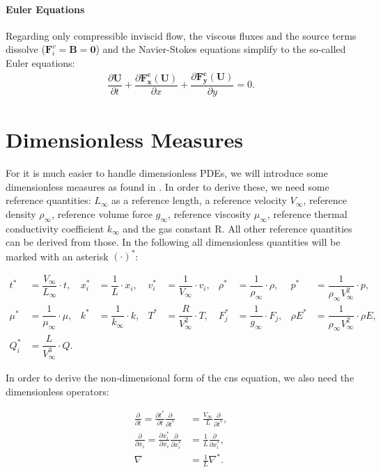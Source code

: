 			\paragraph{Euler Equations}
			Regarding only compressible inviscid flow, the viscous fluxes and the source terms dissolve ($\mathbf{F}_i^v = \mathbf{B} = \mathbf{0}$) and the Navier-Stokes equations simplify to the so-called Euler equations: 
			\begin{align}
				\dfrac{\partial \mathbf{U}}{\partial t} + \dfrac{\partial \mathbf{F_x^c(U)}}{\partial x} + \dfrac{\partial \mathbf{F_y^c(U)}}{\partial y} = 0.
			\end{align}
	
	
	\section{Dimensionless Measures}
	For it is much easier to handle dimensionless PDEs, we will introduce some dimensionless measures as found in \cite{annualreport}. In order to derive these, we need some reference quantities: $L_\infty$ as a reference length, a reference velocity $V_\infty$, reference density $\rho_\infty$, reference volume force $g_\infty$, reference viscosity $\mu_\infty$, reference thermal conductivity coefficient $k_\infty$ and the gas constant R. All other reference quantities can be derived from those. In the following all dimensionless quantities will be marked with an asterisk $(\cdot)^*$:
	
	\begin{align}
		t^* &= \dfrac{V_\infty}{L_\infty} \cdot t,& x_i^* &= \dfrac{1}{L} \cdot x_i, & v_i^* &= \dfrac{1}{V_\infty}\cdot v_i, & \rho^* &= \dfrac{1}{\rho_\infty} \cdot \rho, & p^* &= \dfrac{1}{\rho_\infty V_\infty^2} \cdot p, \\ \nonumber
		 \mu^* &= \dfrac{1}{\mu_\infty} \cdot \mu , & k^* &= \dfrac{1}{k_\infty} \cdot k,&  T^* &= \dfrac{R}{V_\infty^2}\cdot T, & F_j^*& = \dfrac{1}{g_\infty} \cdot F_j, & \rho E^* &= \dfrac{1}{\rho_\infty V_\infty^2} \cdot \rho E, \\ \nonumber
		 Q_i^* &= \dfrac{L}{V_\infty^3} \cdot Q. &
	\end{align}
	
	In order to derive the non-dimensional form of the \gls{cns} equation, we also need the dimensionless operators:
	
	\begin{align}
		\frac{\partial}{\partial t}= \frac{\partial t^*}{\partial t} \frac{\partial}{\partial t^*} &= \frac{V_\infty}{L} \frac{\partial}{\partial t^*}, \\
		\frac{\partial}{\partial x_i} = \frac{\partial x_i^*}{\partial x_i} \frac{\partial}{\partial x_i^*} &= \frac{1}{L} \frac{\partial}{\partial x_i^*}, \\
		\nabla &= \frac{1}{L} \nabla^*.
	\end{align}
	
